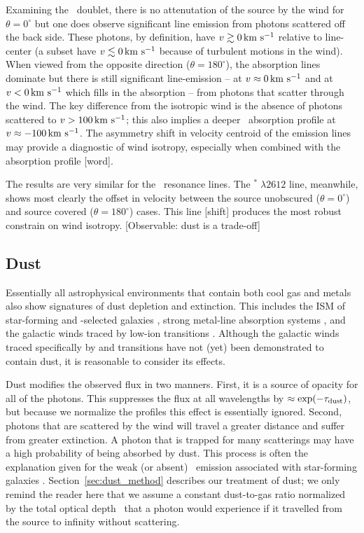 \documentclass[12pt,preprint]{aastex}
\begin{document}
Examining the \mgiid\ doublet, 
there is no attenutation of the source by the wind for $\theta =
0^\circ$
but one does observe significant line emission from photons scattered
off the back side.  These photons, by definition, have $v \gtrsim 0 \, {\rm km~s^{-1}}$
relative to line-center (a subset have $v \lesssim 0 \, {\rm km~s^{-1}}$ because
of turbulent motions in the wind). 
When viewed from the opposite direction ($\theta = 180^\circ$), the
absorption lines dominate but there is still significant
line-emission -- at $v \approx 0 \, {\rm km~s^{-1}}$ and at $v < 0 \, {\rm km~s^{-1}}$ which fills
in the absorption -- from photons that scatter through the wind.  The
key difference from the isotropic wind is the absence of photons
scattered to $v > 100 \, {\rm km~s^{-1}}$;  this also implies a deeper 
\mgiib\ absorption profile at $v \approx -100 \, {\rm km~s^{-1}}$. The asymmetry
shift in velocity centroid of the emission lines
may provide a diagnostic of wind isotropy, especially when combined
with the absorption profile [word].

The results are very similar for the \feiid\ resonance lines.  The
$^* \; \lambda 2612$ line, meanwhile, shows most clearly the
offset in velocity between the source unobscured ($\theta = 0^\circ$)
and source covered ($\theta = 180^\circ$) cases.  This line [shift]
produces the most robust constrain on wind isotropy. [Observable: dust
is a trade-off]

\subsection{Dust}
\label{sec:dust}

Essentially all astrophysical environments that contain both cool gas
and metals also show signatures of dust depletion and extinction.  This includes the
ISM of star-forming and -selected galaxies
\citep[e.g.][]{ss96,pw01,pcd+07}, strong  metal-line
absorption systems \citep{york,menard}, and the galactic winds traced
by low-ion transitions \citep{cb58,naI}.  Although the galactic winds
traced specifically by  and  transitions have not (yet) been
demonstrated to contain dust, it is reasonable to consider its
effects.

Dust modifies the observed flux in two manners. 
First, it is a source of opacity for all of 
the photons.  This suppresses the flux at all
wavelengths by $\approx \exp(-\tau_{\rm dust})$, but because we normalize the profiles 
this effect is essentially ignored.  Second, photons that are
scattered by the wind will travel a greater
distance and suffer from greater extinction.  A photon that is
trapped for many scatterings may have a high probability of being absorbed
by dust.  This process is
often the explanation given for the weak (or absent) \lya\ emission
associated with star-forming galaxies \citep[e.g.][]{lya}.
Section~\ref{sec:dust_method} describes our treatment of dust; we only
remind the reader here that we assume a constant dust-to-gas ratio 
normalized by the total optical
depth \taud\ that a photon would experience if it travelled from the
source to infinity without scattering. 
\end{document}
